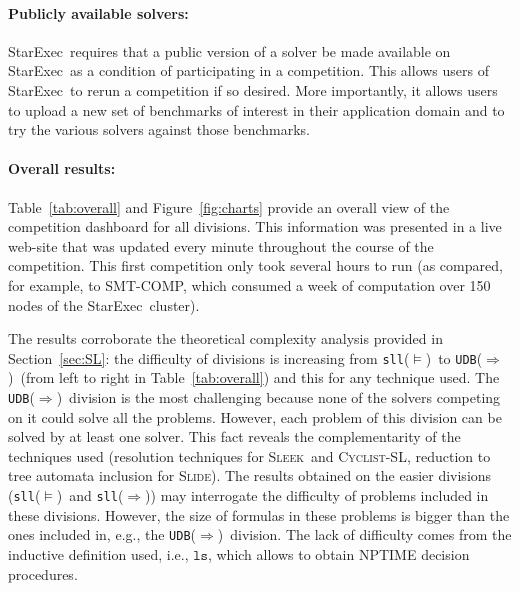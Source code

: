\documentclass[twoside,11pt]{article}
\newcommand{\limp}{\Rightarrow}
\newcommand{\ls}{\mathtt{ls}}
\newcommand{\sllsat}{\texttt{sll}($\models$)}
\newcommand{\sllent}{\texttt{sll}($\limp$)}
\newcommand{\UDBent}{\texttt{UDB}($\limp$)}
\newcommand{\CYCLIST}{\textsc{Cyclist-SL}}
\newcommand{\SLEEK}{\textsc{Sleek}}
\newcommand{\SLIDE}{\textsc{Slide}}
\newcommand{\smtcomp}{\textsf{SMT-COMP}}
\newcommand{\starexec}{\textsf{StarExec}}
\begin{document}
\paragraph{Publicly available solvers:} \starexec\ requires that a public version of a solver be made available on \starexec\ as a condition of participating in a competition. This allows users of \starexec\ to rerun a competition if so desired. More importantly, it allows users to upload a new set of benchmarks of interest in their application domain and to try the various solvers against those benchmarks.

\paragraph{Overall results:}
Table~\ref{tab:overall} and Figure~\ref{fig:charts} provide an overall view of the competition dashboard for all divisions. This information was presented in a live web-site that was updated every minute throughout the course of the competition. This first competition only took several hours to run (as compared, for example, to \smtcomp, which consumed a week of computation over 150 nodes of the \starexec\ cluster).

The results corroborate the theoretical complexity analysis provided in Section~\ref{sec:SL}:
the difficulty of divisions is increasing from \sllsat\ to \UDBent\ (from left to right in Table~\ref{tab:overall}) and this for any technique used. 
The \UDBent\ division is the most challenging because none of the solvers competing on it could solve all the problems. However, each problem of this division can be solved by at least one solver. This fact reveals the complementarity of the techniques used (resolution techniques for \SLEEK\ and \CYCLIST, reduction to tree automata inclusion for \SLIDE).
The results obtained on the easier divisions (\sllsat\ and \sllent) may interrogate the difficulty of problems included in these divisions. However, the size of formulas in these problems is bigger than the ones included in, e.g., the \UDBent\ division. The lack of difficulty comes from the inductive definition used, i.e., $\ls$, which allows to obtain NPTIME decision procedures.
\end{document}

